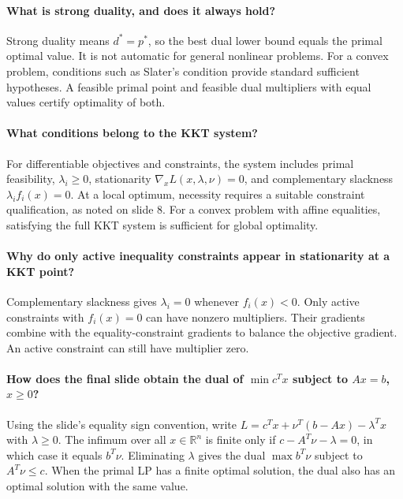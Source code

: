 \documentclass[10pt,english]{article}
\begin{document}
\paragraph{What is strong duality, and does it always hold?}
Strong duality means $d^*=p^*$, so the best dual lower bound equals the primal optimal value.
It is not automatic for general nonlinear problems.
For a convex problem, conditions such as Slater's condition provide standard sufficient hypotheses.
A feasible primal point and feasible dual multipliers with equal values certify optimality of both.

\paragraph{What conditions belong to the KKT system?}
For differentiable objectives and constraints, the system includes primal feasibility, $\lambda_i\geq0$, stationarity $\nabla_xL(x,\lambda,\nu)=0$, and complementary slackness $\lambda_i f_i(x)=0$.
At a local optimum, necessity requires a suitable constraint qualification, as noted on slide 8.
For a convex problem with affine equalities, satisfying the full KKT system is sufficient for global optimality.

\paragraph{Why do only active inequality constraints appear in stationarity at a KKT point?}
Complementary slackness gives $\lambda_i=0$ whenever $f_i(x)<0$.
Only active constraints with $f_i(x)=0$ can have nonzero multipliers.
Their gradients combine with the equality-constraint gradients to balance the objective gradient.
An active constraint can still have multiplier zero.

\paragraph{How does the final slide obtain the dual of $\min c^Tx$ subject to $Ax=b$, $x\geq0$?}
Using the slide's equality sign convention, write $L=c^Tx+\nu^T(b-Ax)-\lambda^Tx$ with $\lambda\geq0$.
The infimum over all $x\in\mathbb{R}^n$ is finite only if $c-A^T\nu-\lambda=0$, in which case it equals $b^T\nu$.
Eliminating $\lambda$ gives the dual $\max b^T\nu$ subject to $A^T\nu\leq c$.
When the primal LP has a finite optimal solution, the dual also has an optimal solution with the same value.
\end{document}
